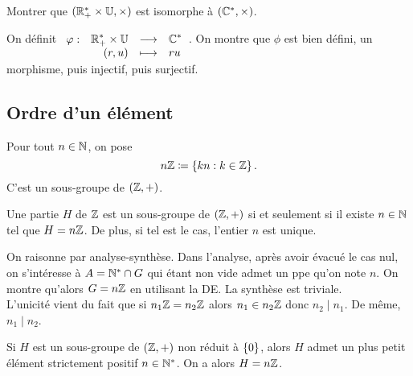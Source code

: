 \documentclass{magnolia}
\begin{document}
\begin{exoUnique}
\exo Montrer que $(\RPs\times\U,\times)$ est isomorphe à $(\mathbb{C}^*,\times)$.
\end{exoUnique}
\begin{sol}
On définit $\dspappli{\phi}{\RPs\times\U}{\Cs}{(r,u)}{ru}$. On montre que $\phi$ est bien défini, un morphisme, puis injectif, puis surjectif.
\end{sol}

\subsection{Ordre d'un élément}

\begin{proposition}
Pour tout $n\in\mathbb{N}$, on pose
\[n\mathbb{Z}\coloneqq\left\{kn : k\in\mathbb{Z}\right\}.\]
C'est un sous-groupe de $(\mathbb{Z},+)$.
\end{proposition}

\begin{proposition}
Une partie $H$ de $\mathbb{Z}$ est un sous-groupe de $(\mathbb{Z},+)$ si et seulement si il
existe $n\in\mathbb{N}$ tel que $H=n\mathbb{Z}$. De plus, si tel est le cas, l'entier $n$ est unique.
\end{proposition}

\begin{preuve}
On raisonne par analyse-synthèse.
Dans l'analyse, après avoir évacué le cas nul, on s'intéresse à $A={\mathbb{N}^*}\cap G$ qui étant non vide admet un ppe qu'on note $n$. On montre qu'alors $G=n\mathbb{Z}$ en utilisant la DE. La synthèse est triviale.\\

L'unicité vient du fait que si $n_1\mathbb{Z}=n_2\mathbb{Z}$ alors $n_1\in n_2\mathbb{Z}$ donc $n_2\mid n_1$. De même, $n_1\mid n_2$.
\end{preuve}

\begin{remarqueUnique}
\remarque Si $H$ est un sous-groupe de $(\mathbb{Z},+)$ non réduit à $\left\{0\right\}$, alors
  $H$ admet un plus petit élément strictement positif $n\in{\mathbb{N}^*}$. On a alors $H=n\mathbb{Z}$.
\end{remarqueUnique}
\end{document}
